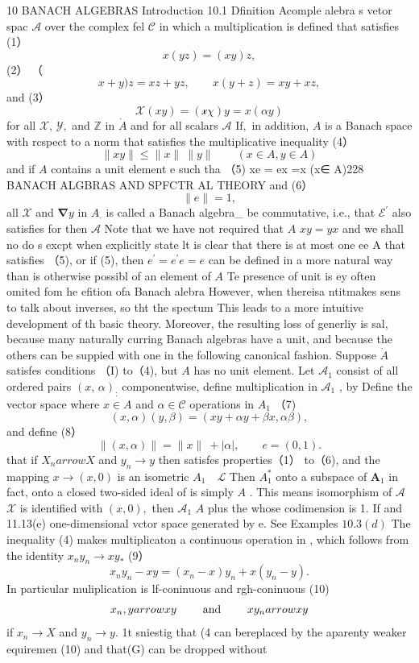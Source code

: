 10 BANACH ALGEBRAS Introduction 10.1 Dfinition Acomple alebra s vetor spac $\textstyle{\mathcal{A}}$ over the complex fel $\textstyle{\mathcal{C}}$ in which a multiplication is defined that satisfies (1） $$ x(y z)=(x y)z, $$ (2） （ $$ x+y)z=x z+y z,\qquad x(y+z)=x y+x z, $$ and (3） $$ \mathcal{X}(x y)=(\mathcal{x}\chi)y=x(\alpha y) $$ for all ${\mathcal{X}},\,{\mathcal{Y}},$ and $\mathbb{Z}$ in $\dot{A}$ and for all scalars $\textstyle{\mathcal{A}}$ $\mathrm{If},$ in addition, $\textstyle{A}$ is a Banach space with rcspect to a norm that satisfies the multiplicative inequality (4） $$ \|x y\|\leq\|x\|\ \|y\|\qquad(x\in A,y\in A) $$ and if $\textstyle A$ contains a unit element e such tha （5) xe = ex =x (x∈ A)228 BANACH ALGBRAS AND SPFCTR AL THEORY and (6） $$ \|e\|=1, $$ all $\textstyle{\mathcal{X}}$ and $\mathbf{\nabla}y$ in $A_{\cdot}$ is called a Banach algebra_ be commutative, i.e., that ${\mathcal{E}}^{\prime}$ also satisfies for then $\textstyle{\mathcal{A}}$ Note that we have not required that $\textstyle A$ $x y=y x$ and we shall no do s excpt when explicitly state lt is clear that there is at most one ee A that satisfies （5), or if (5), then $e^{\prime}=e^{\prime}e=e$ can be defined in a more natural way than is otherwise possibl of an element of $\textstyle A$ Te presence of unit is ey often omited fom he efition ofa Banach alebra However, when thereisa ntitmakes sens to talk about inverses, so tht the spectum This leads to a more intuitive development of th basic theory. Moreover, the resulting loss of generliy is sal, because many naturally curring Banach algebras have a unit, and because the others can be suppied with one in the following canonical fashion. Suppose $\scriptstyle{\dot{A}}$ satisfes conditions （I) to（4), but $\textstyle A$ has no unit element. Let ${\mathcal{A}}_{1}$ consist of all ordered pairs $(x,\,\alpha)_{:}$ componentwise, define multiplication in ${\mathcal{A}}_{1}$ , by Define the vector space where $x\in A$ and $\alpha\in{\mathcal{C}}$ operations in $A_{1}$ （7) $$ (x,\alpha)(y,\beta)=(x y+\alpha y+\beta x,\alpha\beta), $$ and define (8） $$ \|(x,\alpha)\|=\|x\|\ +\left|\alpha\right|,\qquad e=(0,1). $$ that if $X_{n} arrow X$ and $y_{n}\to y$ then satisfes properties（1） to（6), and the mapping $x\to(x,0)$ is an isometric $\scriptstyle A_{1}\quad{\mathcal{L}}$ Then $A_{1}^{*}$ onto a subspace of ${\boldsymbol{A}}_{1}$ in fact, onto a closed two-sided ideal of is simply $\scriptstyle A$ . This means isomorphism of $\mathcal{A}$ $\textstyle{\mathcal{X}}$ is identified with $(x,0),$ then ${\mathcal{A}}_{1}$ $\scriptstyle{A}$ plus the whose codimension is 1. If and 11.13(e) one-dimensional vctor space generated by e. See Examples $10.3(d)$ The inequality (4) makes multiplicaton a continuous operation in , which follows from the identity $x_{n}y_{n}\to x y_{*}$ (9） $$ x_{n}y_{n}-x y=(x_{n}-x)y_{n}+x(y_{n}-y). $$ In particular muliplication is lf-coninuous and rgh-coninuous (10) $$ \begin{array}{l l}{{x_{n},y arrow x y}}&{{\ \ \ \ \mathrm{and}\qquad\ x y_{n} arrow x y}}\end{array} $$ if $x_{n}\to X$ and $y_{n}\to y.$ 1t sniestig that (4 can bereplaced by the aparenty weaker equiremen (10) and that(G) can be dropped without 